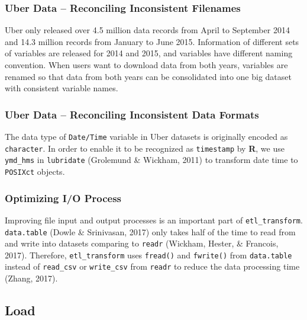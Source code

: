 \documentclass[12pt,twoside]{reedthesis}
\theoremstyle{definition}
\theoremstyle{definition}
\theoremstyle{definition}
\theoremstyle{remark}
\begin{document}
\subsubsection{Uber Data -- Reconciling Inconsistent
Filenames}\label{uber-data-reconciling-inconsistent-filenames}

Uber only released over 4.5 million data records from April to September
2014 and 14.3 million records from January to June 2015. Information of
different sets of variables are released for 2014 and 2015, and
variables have different naming convention. When users want to download
data from both years, variables are renamed so that data from both years
can be consolidated into one big dataset with consistent variable names.

\subsubsection{Uber Data -- Reconciling Inconsistent Data
Formats}\label{uber-data-reconciling-inconsistent-data-formats}

The data type of \texttt{Date/Time} variable in Uber datasets is
originally encoded as \texttt{character}. In order to enable it to be
recognized as \texttt{timestamp} by \textbf{R}, we use \texttt{ymd\_hms}
in \texttt{lubridate} (Grolemund \& Wickham, 2011) to transform date
time to \texttt{POSIXct} objects.

\subsubsection{Optimizing I/O Process}\label{optimizing-io-process}

Improving file input and output processes is an important part of
\texttt{etl\_transform}. \texttt{data.table} (Dowle \& Srinivasan, 2017)
only takes half of the time to read from and write into datasets
comparing to \texttt{readr} (Wickham, Hester, \& Francois, 2017).
Therefore, \texttt{etl\_transform} uses \texttt{fread()} and
\texttt{fwrite()} from \texttt{data.table} instead of \texttt{read\_csv}
or \texttt{write\_csv} from \texttt{readr} to reduce the data processing
time (Zhang, 2017).

\subsection{Load}\label{load}
\end{document}
